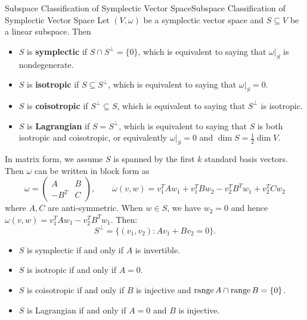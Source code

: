 \documentclass[../main.tex]{subfiles}
\begin{document}
\begin{definition}{Subspace Classification of Symplectic Vector Space}{Subspace Classification of Symplectic Vector Space}
  Let $(V, \omega)$ be a symplectic vector space and $S \subseteq V$ be a linear subspace. Then
  \begin{itemize}
    \item $S$ is \textbf{symplectic} if $S \cap S^\perp = \{0\}$, which is equivalent to saying that $\omega|_S$ is nondegenerate.
    \item $S$ is \textbf{isotropic} if $S \subseteq S^\perp$, which is equivalent to saying that $\omega|_S = 0$.
    \item $S$ is \textbf{coisotropic} if $S^\perp \subseteq S$, which is equivalent to saying that $S^\perp$ is isotropic.
    \item $S$ is \textbf{Lagrangian} if $S = S^\perp$, which is equivalent to saying that $S$ is both isotropic and coisotropic, or equivalently $\omega|_S = 0$ and $\dim S = \frac{1}{2} \dim V$.
  \end{itemize}
\end{definition}
In matrix form, we assume $S$ is spanned by the first $k$ standard basis vectors. Then $\omega$ can be written in block form as
\begin{equation}
  \omega = \begin{pmatrix}
    A & B \\
    -B^T & C
  \end{pmatrix}, \qquad \omega(v, w) = v_1^T A w_1 + v_1^T B w_2 - v_2^T B^T w_1 + v_2^T C w_2
\end{equation}
where $A,C$ are anti-symmetric. When $w\in S$, we have $w_2 = 0$ and hence $\omega(v, w) = v_1^T A w_1 - v_2^T B^T w_1$. Then:
\begin{equation*}
  S^\perp = \{(v_1, v_2): A v_1 + B v_2 = 0\}.
\end{equation*}
\begin{itemize}
  \item $S$ is symplectic if and only if $A$ is invertible.
  \item $S$ is isotropic if and only if $A = 0$.
  \item $S$ is coisotropic if and only if $B$ is injective and $\operatorname{range} A \cap \operatorname{range} B = \{0\}$.
  \item $S$ is Lagrangian if and only if $A = 0$ and $B$ is injective.
\end{itemize}
\end{document}
